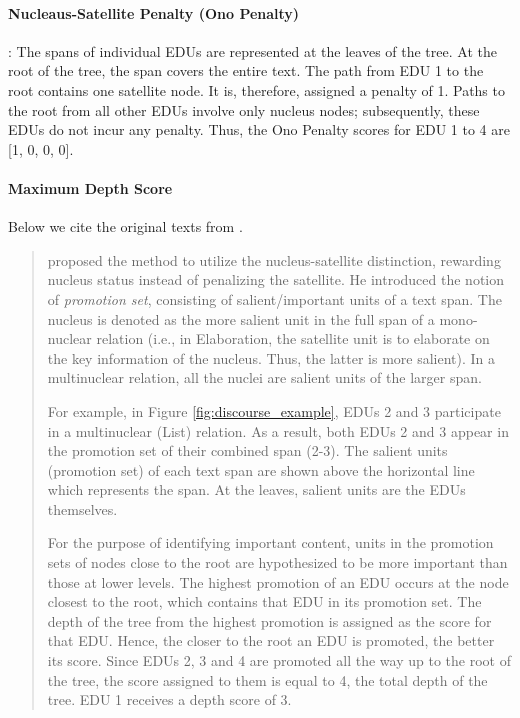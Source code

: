 \paragraph{Nucleaus-Satellite Penalty (Ono Penalty)}\cite{ono-etal-1994-abstract}: The spans of individual EDUs are represented
at the leaves of the tree. At the root of the tree, the
span covers the entire text. The path from EDU 1
to the root contains one satellite node. It is, therefore, assigned a penalty of 1. Paths to the root from
all other EDUs involve only nucleus nodes; subsequently, these EDUs do not incur any penalty. Thus, the Ono Penalty scores for EDU 1 to 4 are [1, 0, 0, 0].

\paragraph{Maximum Depth Score}
Below we cite the original texts from \cite{louis-etal-2010-discourse}.
\begin{quote}


\citet{Marcu1998tobuild} proposed the method to utilize the nucleus-satellite distinction, rewarding nucleus status instead of penalizing the satellite. He introduced the notion of \textit{promotion set}, consisting of
salient/important units of a text span. The nucleus is denoted as the more salient unit in the full span of
a mono-nuclear relation (i.e., in Elaboration, the satellite unit is to elaborate on the key information of the nucleus. Thus, the latter is more salient). In a multinuclear relation,
all the nuclei are salient units of the larger span.

For example, in Figure \ref{fig:discourse_example}, EDUs 2 and 3 participate in a multinuclear (List) relation. As a result,
both EDUs 2 and 3 appear in the promotion set of
their combined span (2-3). The salient units (promotion
set) of each text span are shown above the horizontal line which represents the span. At the leaves,
salient units are the EDUs themselves.


For the purpose of identifying important content, units in the promotion sets of nodes close to
the root are hypothesized to be more important
than those at lower levels. The highest promotion of an EDU occurs at the node closest to the
root, which contains that EDU in its promotion set.
The depth of the tree from the highest promotion
is assigned as the score for that EDU. Hence, the
closer to the root an EDU is promoted, the better
its score. Since EDUs 2, 3 and 4 are promoted all
the way up to the root of the tree, the score assigned to them is equal to 4, the total depth of the
tree. EDU 1 receives a depth score of 3.
\end{quote}

